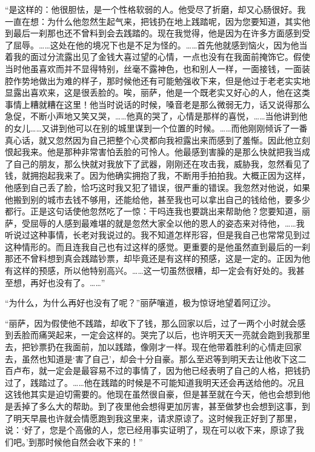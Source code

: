 \par “是这样的：他很胆怯，是一个性格软弱的人。他受尽了折磨，却又心肠很好。我一直在想：为什么他忽然生起气来，把钱扔在地上践踏呢，因为您要知道，其实他到最后一刹那也还不曾料到会去践踏的。现在我觉得，他是因为在许多方面感到受了屈辱。……这处在他的境况下也是不足为怪的。……首先他就感到恼火，因为他当着我的面过分流露出见了金钱大喜过望的心情，一点也没有在我面前掩饰它。假使当时他虽喜欢而并不显得特别，丝毫不露神色，也和别人一样，一面接钱，一面装腔作势地做出为难的样子，那时候他还有可能勉强收下来，但是他过于老老实实地显露出喜欢来，这是很丢脸的。唉，丽萨，他是一个既老实又好心的人，他在这类事情上糟就糟在这里！他当时说话的时候，嗓音老是那么微弱无力，话又说得那么急促，不断小声地又笑又哭，……他真的哭了，心情是那样的喜悦，……当他讲到他的女儿……又讲到他可以在别的城里谋到一个位置的时候。……而他刚刚倾诉了一番真心话，就又忽然因为自己把整个心灵都向我袒露出来而感到了羞惭。因此他立刻恨起我来。他是那种非常害怕丢脸的可怜人。他最感到害臊的是那么快就把我当成了自己的朋友，那么快就对我放下了武器，刚刚还在攻击我，威胁我，忽然看见了钱，就拥抱起我来了。因为他确实拥抱了我，不断用手拍拍我。大概正因为这样，他感到自己丢了脸，恰巧这时我又犯了错误，很严重的错误。我忽然对他说，如果他搬到别的城市去钱不够用，还能给他，甚至我也可以拿出自己的钱给他，要多少都行。正是这句话使他忽然吃了一惊：干吗连我也要跳出来帮助他？您要知道，丽萨，受屈辱的人感到最难堪的就是忽然大家全以他的恩人的姿态来对待他，……我听说过这种事情，长老对我说过的。我不知道怎样形容，但是我自己也常常见到过这种情形的。而且连我自己也有过这样的感觉。更重要的是他虽然直到最后的一刹那还不曾料想到真会践踏钞票，却毕竟还是有这样的预感，这是一定的。正因为他有这样的预感，所以他特别高兴。……这一切虽然很糟，却一定会有好处的。我甚至想，再好也没有了。……”
\par “为什么，为什么再好也没有了呢？”丽萨嚷道，极为惊讶地望着阿辽沙。
\par “丽萨，因为假使他不践踏，却收下了钱，那么回家以后，过了一两个小时就会感到丢脸而痛哭起来，一定会这样的。哭完了以后，也许明天天一亮就会跑到我那里去，把钞票扔在我面前，加以践踏，像刚才一样。现在他带着胜利的心情走回家去，虽然也知道是‘害了自己’，却会十分自豪。那么至迟等到明天去让他收下这二百卢布，就一定会是最容易不过的事情了，因为他已经表明了自己的人格，把钱扔过了，践踏过了。……他在践踏的时候是不可能知道我明天还会再送给他的。况且这钱他其实是迫切需要的。他现在虽然很自豪，但是甚至就在今天，他也会想到他是丢掉了多么大的帮助。到了夜里他会想得更加厉害，甚至做梦也会想到这事，到了明天早晨也许就会情愿跑到我这里来，请求原谅了。这时候我正好到了那里，说：‘好了，您是个高傲的人，您已经用事实证明了，现在可以收下来，原谅了我们吧。’到那时候他自然会收下来的！”
